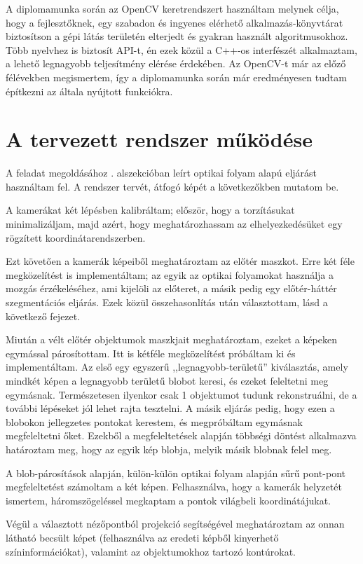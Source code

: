 A diplomamunka során az OpenCV \cite{opencv} keretrendszert használtam melynek célja, hogy a fejlesztőknek, egy szabadon és ingyenes elérhető alkalmazás-könyvtárat biztosítson a gépi látás területén elterjedt és gyakran használt algoritmusokhoz. Több nyelvhez is biztosít API-t, én ezek közül a C++-os interfészét alkalmaztam, a lehető legnagyobb teljesítmény elérése érdekében. Az OpenCV-t már az előző félévekben megismertem, így a diplomamunka során már eredményesen tudtam építkezni az általa nyújtott funkciókra.

\section{A tervezett rendszer működése}

A feladat megoldásához . alszekcióban leírt optikai folyam alapú eljárást használtam fel. A rendszer tervét, átfogó képét a következőkben mutatom be.

A kamerákat két lépésben kalibráltam; először, hogy a torzításukat minimalizáljam, majd azért, hogy meghatározhassam az elhelyezkedésüket egy rögzített koordinátarendszerben.

Ezt követően a kamerák képeiből meghatároztam az előtér maszkot. Erre két féle megközelítést is implementáltam; az egyik az optikai folyamokat használja a mozgás érzékeléséhez, ami kijelöli az előteret, a másik pedig egy előtér-háttér szegmentációs eljárás. Ezek közül összehasonlítás után választottam, lásd a következő fejezet.

Miután a vélt előtér objektumok maszkjait meghatároztam, ezeket a képeken egymással párosítottam. Itt is kétféle megközelítést próbáltam ki és implementáltam. Az első egy egyszerű ,,legnagyobb-területű'' kiválasztás, amely mindkét képen a legnagyobb területű blobot keresi, és ezeket feleltetni meg egymásnak. Természetesen ilyenkor csak 1 objektumot tudunk rekonstruálni, de a további lépéseket jól lehet rajta tesztelni. A másik eljárás pedig, hogy ezen a blobokon jellegzetes pontokat kerestem, és megpróbáltam egymásnak megfeleltetni őket. Ezekből a megfeleltetések alapján többségi döntést alkalmazva határoztam meg, hogy az egyik kép blobja, melyik másik blobnak felel meg.

A blob-párosítások alapján, külön-külön optikai folyam alapján sűrű pont-pont megfeleltetést számoltam a két képen. Felhasználva, hogy a kamerák helyzetét ismertem, háromszögeléssel megkaptam a pontok világbeli koordinátájukat. 

Végül a választott nézőpontból projekció segítségével meghatároztam az onnan látható becsült képet (felhasználva az eredeti képből kinyerhető színinformációkat), valamint az objektumokhoz tartozó kontúrokat.

